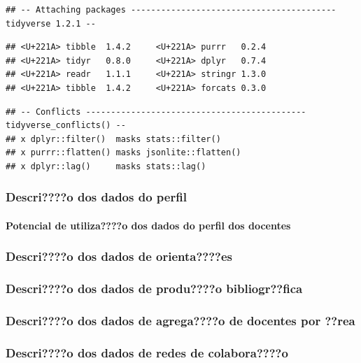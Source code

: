 \documentclass[]{article}
\let\oldparagraph\paragraph
\renewcommand{\paragraph}[1]{\oldparagraph{#1}\mbox{}}
\begin{document}
\begin{verbatim}
## -- Attaching packages ----------------------------------------- tidyverse 1.2.1 --
\end{verbatim}

\begin{verbatim}
## <U+221A> tibble  1.4.2     <U+221A> purrr   0.2.4
## <U+221A> tidyr   0.8.0     <U+221A> dplyr   0.7.4
## <U+221A> readr   1.1.1     <U+221A> stringr 1.3.0
## <U+221A> tibble  1.4.2     <U+221A> forcats 0.3.0
\end{verbatim}

\begin{verbatim}
## -- Conflicts -------------------------------------------- tidyverse_conflicts() --
## x dplyr::filter()  masks stats::filter()
## x purrr::flatten() masks jsonlite::flatten()
## x dplyr::lag()     masks stats::lag()
\end{verbatim}

\subsubsection{Descri????o dos dados do
perfil}\label{descrio-dos-dados-do-perfil}

\paragraph{Potencial de utiliza????o dos dados do perfil dos
docentes}\label{potencial-de-utilizao-dos-dados-do-perfil-dos-docentes}

\subsubsection{Descri????o dos dados de
orienta????es}\label{descrio-dos-dados-de-orientaes}

\subsubsection{Descri????o dos dados de produ????o
bibliogr??fica}\label{descrio-dos-dados-de-produo-bibliogrfica}

\subsubsection{Descri????o dos dados de agrega????o de docentes por
??rea}\label{descrio-dos-dados-de-agregao-de-docentes-por-rea}

\subsubsection{Descri????o dos dados de redes de
colabora????o}\label{descrio-dos-dados-de-redes-de-colaborao}
\end{document}

